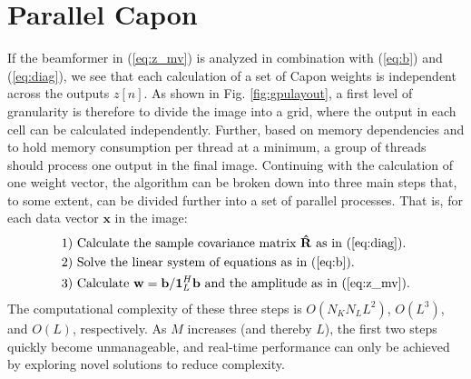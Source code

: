 \documentclass[journal]{IEEEtran}
\newcommand{\mat}[1]{\mathbf{#1}}
\renewcommand{\vec}[1]{\mathbf{#1}}
\begin{document}
\section{Parallel Capon}\label{sec:meth}
If the beamformer in (\ref{eq:z_mv}) is analyzed in combination with (\ref{eq:b}) and (\ref{eq:diag}), we see that each calculation of a set of Capon weights is independent across the outputs $z[n]$. As shown in Fig. \ref{fig:gpulayout}, a first level of granularity is therefore to divide the image into a grid, where the output in each cell can be calculated independently. Further, based on memory dependencies and to hold memory consumption per thread at a minimum, a group of threads should process one output in the final image. Continuing with the calculation of one weight vector, the algorithm can be broken down into three main steps that, to some extent, can be divided further into a set of parallel processes. That is, for each data vector $\vec{x}$ in the image:
\begin{align*}
\text{1) } &\text{Calculate the sample covariance matrix } \mat{\hat{R}} \text{ as in } \text{(\ref{eq:diag})}.\\
\text{2) } &\text{Solve the linear system of equations as in (\ref{eq:b}}).\\ %
\text{3) } &\text{Calculate } \vec{w} = \vec{b}/\vec{1}_{L}^H\vec{b} \text{ and the amplitude as in (\ref{eq:z_mv})}.
\end{align*}
The computational complexity of these three steps is $O(N_KN_LL^2)$, $O(L^3)$, and $O(L)$, respectively. As $M$ increases (and thereby $L$), the first two steps quickly become unmanageable, and real-time performance can only be achieved by exploring novel solutions to reduce complexity.
\end{document}
